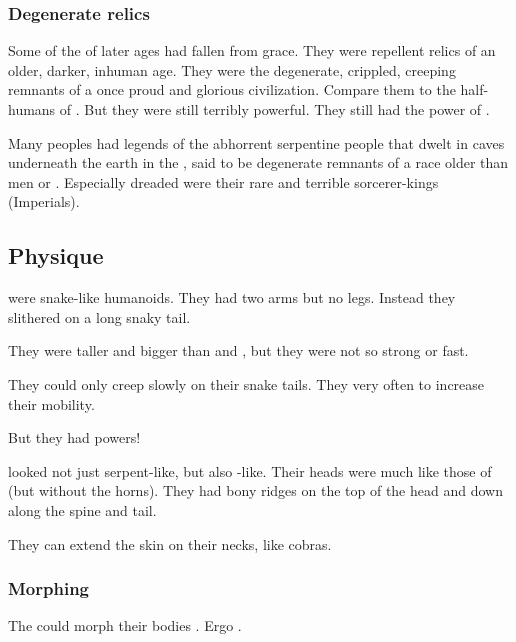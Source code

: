 \subsubsection{Degenerate relics}
Some of the \ophidian {} of later ages had fallen from grace.
They were repellent relics of an older, darker, inhuman age. 
They were the degenerate, crippled, creeping remnants of a once proud and glorious civilization. 
Compare them to the half-humans of \cite{RobertEHoward:WormsoftheEarth}. 
But they were still terribly powerful.
They still had the power of . 

Many peoples had legends of the abhorrent serpentine people that dwelt in caves underneath the earth in the \wylde, said to be degenerate remnants of a race older than men or \scathae. 
Especially dreaded were their rare and terrible sorcerer-kings (Imperials).









\subsection{Physique}
\Ophidians were snake-like humanoids. 
They had two arms but no legs. 
Instead they slithered on a long snaky tail. 

They were taller and bigger than \humans{} and \scathae, but they were not so strong or fast. 

They could only creep slowly on their snake tails. 
They very often  to increase their mobility. 

But they had  powers! 

\Ophidians looked not just serpent-like, but also \dragon-like. 
Their heads were much like those of \dragons (but without the horns). 
They had bony ridges on the top of the head and down along the spine and tail. 

They can extend the skin on their necks, like cobras. 





\subsubsection{Morphing}
The \quiljaaran could morph their bodies . 
Ergo . 

